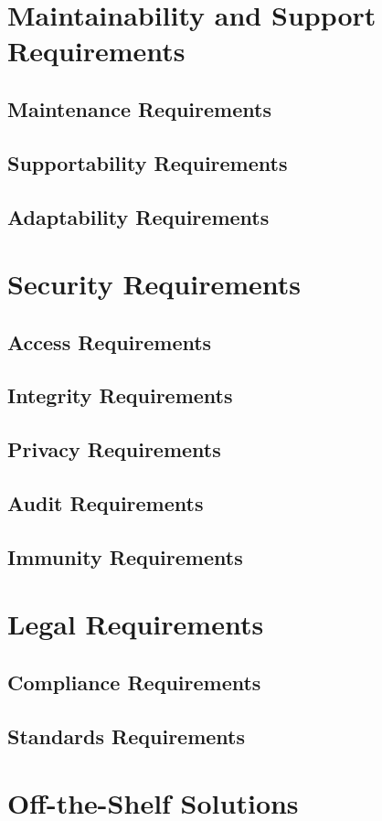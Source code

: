 \documentclass[12pt,a4paper]{article}
\begin{document}
\section{Maintainability and Support Requirements}
\subsection{Maintenance Requirements}
\subsection{Supportability Requirements}
\subsection{Adaptability Requirements}
\pagebreak
\section{Security Requirements}
\subsection{Access Requirements}
\subsection{Integrity Requirements}
\subsection{Privacy Requirements}
\subsection{Audit Requirements}
\subsection{Immunity Requirements}
\pagebreak
\section{Legal Requirements}
\subsection{Compliance Requirements}
\subsection{Standards Requirements}
\pagebreak
\section{Off-the-Shelf Solutions}
\pagebreak
\end{document}
